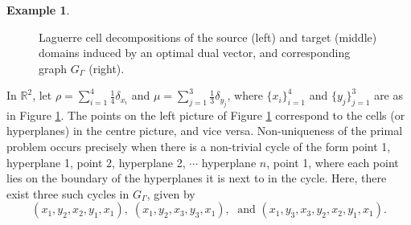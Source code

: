 \documentclass[11pt, oneside, titlepage]{book}
\theoremstyle{plain}
\theoremstyle{definition}
\newtheorem{example}[theorem]{Example}
\newcommand{\R}{\mathbb{R}}
\begin{document}
\begin{example}
\begin{figure}
\begin{minipage}{0.31\linewidth}
\end{minipage}\hfill
\caption{Laguerre cell decompositions of the source (left) and target (middle) domains induced by an optimal dual vector, and corresponding graph $G_\Gamma$ (right).}
\label{fig:discrete-cell-example}
\end{figure}
In $\R^2$, let $\rho = \sum_{i=1}^4 \frac{1}{4}\delta_{x_i}$ and $\mu = \sum_{j=1}^3 \frac{1}{3} \delta_{y_j}$,  where $\{x_i\}_{i = 1}^4$ and $\{y_j\}_{j=1}^3$ are as in Figure \ref{fig:discrete-cell-example}. The points on the left picture of Figure \ref{fig:discrete-cell-example} correspond to the cells (or hyperplanes) in the centre picture, and vice versa. Non-uniqueness of the primal problem occurs precisely when there is a non-trivial cycle of the form point 1, hyperplane 1, point 2, hyperplane 2, $\cdots$ hyperplane $n$, point 1, where each point lies on the boundary of the hyperplanes it is next to in the cycle. Here, there exist three such cycles in $G_\Gamma$, given by
\begin{equation*}
    (x_1, y_2, x_2, y_1, x_1), \; (x_1, y_2, x_3, y_3, x_1), \; \text{ and } (x_1, y_3, x_3, y_2, x_2, y_1, x_1).
\end{equation*}
\end{example}
\end{document}
